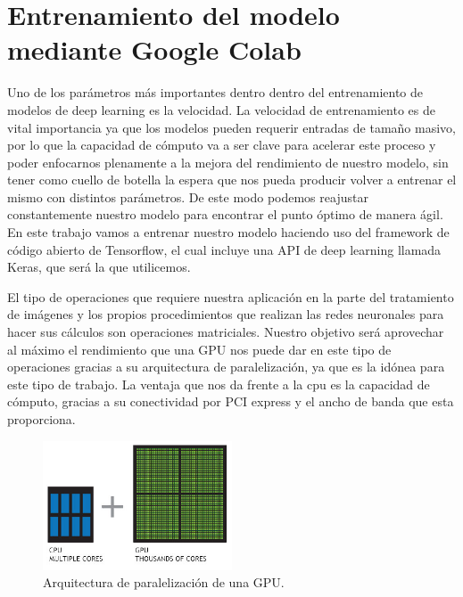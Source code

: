 \mbox{}


\chapter{Entrenamiento del modelo mediante Google Colab}
\label{ch:chapter2}
Uno de los parámetros más importantes dentro dentro del entrenamiento de modelos de deep learning es la velocidad.
La velocidad de entrenamiento es de vital importancia ya que los modelos pueden requerir entradas de tamaño masivo, por lo que la capacidad de cómputo
va a ser clave para acelerar este proceso y poder enfocarnos plenamente a la mejora del rendimiento de nuestro modelo, sin tener como cuello de botella la espera
que nos pueda producir volver a entrenar el mismo con distintos parámetros.
De este modo podemos reajustar constantemente nuestro modelo para encontrar el punto óptimo de manera ágil.
En este trabajo vamos a entrenar nuestro modelo haciendo uso del framework de código abierto de Tensorflow, el cual incluye una API de deep learning llamada Keras, que será la que utilicemos.

El tipo de operaciones que requiere nuestra aplicación en la parte del tratamiento de imágenes y los propios procedimientos que realizan las redes neuronales
para hacer sus cálculos son operaciones matriciales.
Nuestro objetivo será aprovechar al máximo el rendimiento que una GPU nos puede dar en este tipo de operaciones gracias
a su arquitectura de paralelización, ya que es la idónea para este tipo de trabajo.
La ventaja que nos da frente a la cpu es la capacidad de cómputo, gracias a su conectividad por PCI express y el ancho de banda que esta proporciona.

\begin{figure}
    \centering
    \includegraphics[width=0.5\textwidth]{images/chapter2/cpu-and-gpu.jpg}
    \caption{Arquitectura de paralelización de una GPU.}
    \label{fig:Arquitectura de paralelización de una GPU}
\end{figure}


